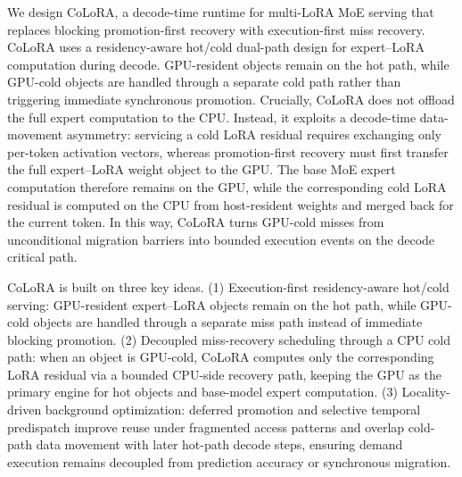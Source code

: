 \documentclass[sigplan,anonymous,review,10pt]{acmart}
\begin{document}
We design CoLoRA, a decode-time runtime for multi-LoRA MoE serving that replaces blocking promotion-first recovery with execution-first miss recovery. CoLoRA uses a residency-aware hot/cold dual-path design for expert--LoRA computation during decode. GPU-resident objects remain on the hot path, while GPU-cold objects are handled through a separate cold path rather than triggering immediate synchronous promotion. Crucially, CoLoRA does not offload the full expert computation to the CPU. Instead, it exploits a decode-time data-movement asymmetry: servicing a cold LoRA residual requires exchanging only per-token activation vectors, whereas promotion-first recovery must first transfer the full expert--LoRA weight object to the GPU. The base MoE expert computation therefore remains on the GPU, while the corresponding cold LoRA residual is computed on the CPU from host-resident weights and merged back for the current token. In this way, CoLoRA turns GPU-cold misses from unconditional migration barriers into bounded execution events on the decode critical path.

CoLoRA is built on three key ideas. (1) Execution-first residency-aware hot/cold serving: GPU-resident expert--LoRA objects remain on the hot path, while GPU-cold objects are handled through a separate miss path instead of immediate blocking promotion. (2) Decoupled miss-recovery scheduling through a CPU cold path: when an object is GPU-cold, CoLoRA computes only the corresponding LoRA residual via a bounded CPU-side recovery path, keeping the GPU as the primary engine for hot objects and base-model expert computation. (3) Locality-driven background optimization: deferred promotion and selective temporal predispatch improve reuse under fragmented access patterns and overlap cold-path data movement with later hot-path decode steps, ensuring demand execution remains decoupled from prediction accuracy or synchronous migration.
\end{document}
